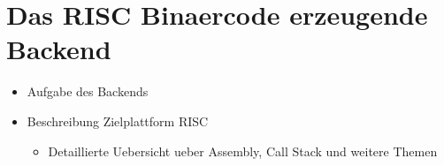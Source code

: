 \chapter{Das RISC Binaercode erzeugende Backend}
\label{chap:theory:risc}

\begin{itemize}
  \item Aufgabe des Backends
  \item Beschreibung Zielplattform RISC
  \begin{itemize}
    \item Detaillierte Uebersicht ueber Assembly, Call Stack und weitere Themen
  \end{itemize}
\end{itemize}
